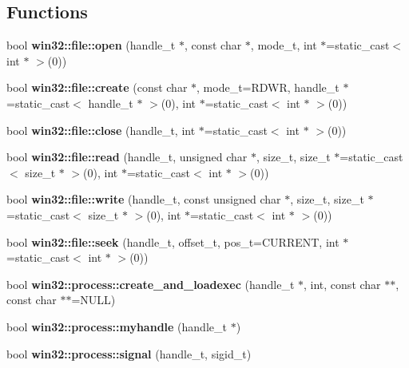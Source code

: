 \subsection*{Functions}
\begin{CompactItemize}
\item 
bool {\bf win32::file::open} (handle\_\-t $\ast$, const char $\ast$, mode\_\-t, int $\ast$=static\_\-cast$<$ int $\ast$ $>$(0))\label{namespacewin32_1_1file_01c41f89a65430585a1ca5e434651964}

\item 
bool {\bf win32::file::create} (const char $\ast$, mode\_\-t=RDWR, handle\_\-t $\ast$=static\_\-cast$<$ handle\_\-t $\ast$ $>$(0), int $\ast$=static\_\-cast$<$ int $\ast$ $>$(0))\label{namespacewin32_1_1file_5ce7a9fe6a82d8f2ca19cd3d355b14cd}

\item 
bool {\bf win32::file::close} (handle\_\-t, int $\ast$=static\_\-cast$<$ int $\ast$ $>$(0))\label{namespacewin32_1_1file_4f2158ffd120bc4807dbcc107f84e8fc}

\item 
bool {\bf win32::file::read} (handle\_\-t, unsigned char $\ast$, size\_\-t, size\_\-t $\ast$=static\_\-cast$<$ size\_\-t $\ast$ $>$(0), int $\ast$=static\_\-cast$<$ int $\ast$ $>$(0))\label{namespacewin32_1_1file_b65a8fb90f015826cb6c65a40a200cb0}

\item 
bool {\bf win32::file::write} (handle\_\-t, const unsigned char $\ast$, size\_\-t, size\_\-t $\ast$=static\_\-cast$<$ size\_\-t $\ast$ $>$(0), int $\ast$=static\_\-cast$<$ int $\ast$ $>$(0))\label{namespacewin32_1_1file_4113821876a7144b7881ce90c794817c}

\item 
bool {\bf win32::file::seek} (handle\_\-t, offset\_\-t, pos\_\-t=CURRENT, int $\ast$=static\_\-cast$<$ int $\ast$ $>$(0))\label{namespacewin32_1_1file_70c66619ffd143ce4dfb4b1f53cb9554}

\item 
bool {\bf win32::process::create\_\-and\_\-loadexec} (handle\_\-t $\ast$, int, const char $\ast$$\ast$, const char $\ast$$\ast$=NULL)\label{namespacewin32_1_1process_74075ca5310b2d722062de9e4ab40dd2}

\item 
bool {\bf win32::process::myhandle} (handle\_\-t $\ast$)\label{namespacewin32_1_1process_7fcb06bda957687be5f81acc6b32ea65}

\item 
bool {\bf win32::process::signal} (handle\_\-t, sigid\_\-t)\label{namespacewin32_1_1process_65bed66a4a1fb5aaa466cdf76c2c361c}


\end{CompactItemize}
